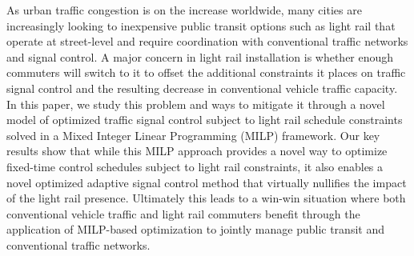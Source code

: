 As urban traffic congestion is on the increase worldwide, many cities
are increasingly looking to inexpensive public transit options such as
light rail that operate at street-level and require coordination with
conventional traffic networks and signal control. A major concern in
light rail installation is whether enough commuters will switch to it
to offset the additional constraints it places on traffic signal
control and the resulting decrease in conventional vehicle traffic
capacity. In this paper, we study this problem and ways to mitigate it
through a novel model of optimized traffic signal control subject to
light rail schedule constraints solved in a Mixed Integer Linear
Programming (MILP) framework. Our key results show that while this 
MILP approach provides a novel way to optimize fixed-time control
schedules subject to light rail constraints, it also enables a
novel optimized adaptive signal control method that virtually nullifies the
impact of the light rail presence.  Ultimately this leads to a win-win
situation where both conventional vehicle traffic and light rail
commuters benefit through the application of MILP-based optimization
to jointly manage public transit and conventional traffic networks.
